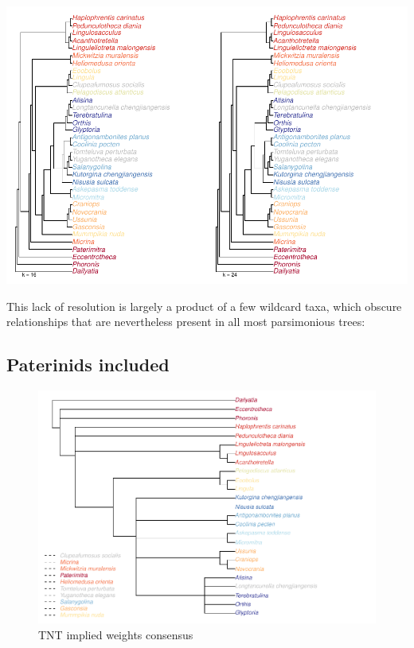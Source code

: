 \documentclass[]{book}
\theoremstyle{definition}
\theoremstyle{definition}
\theoremstyle{definition}
\theoremstyle{remark}
\begin{document}
\includegraphics{Brachiopod_phylogeny_files/figure-latex/unnamed-chunk-9-1.pdf}

This lack of resolution is largely a product of a few wildcard taxa,
which obscure relationships that are nevertheless present in all most
parsimonious trees:

\hypertarget{paterinids-included}{%
\subsection{Paterinids included}\label{paterinids-included}}

\begin{figure}
\centering
\includegraphics{Brachiopod_phylogeny_files/figure-latex/unnamed-chunk-10-1.pdf}
\caption{\label{fig:unnamed-chunk-10}TNT implied weights consensus}
\end{figure}
\end{document}
